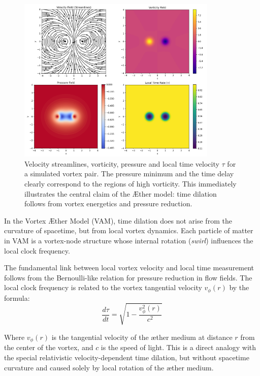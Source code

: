 \begin{figure}[htbp]
    \centering
    \includegraphics[width=0.85\textwidth]{images/01-streamlinesDiPole}
    \caption{Velocity streamlines, vorticity, pressure and local time velocity $\tau$ for a simulated vortex pair. The pressure minimum and the time delay clearly correspond to the regions of high vorticity. This immediately illustrates the central claim of the Æther model: time dilation follows from vortex energetics and pressure reduction.}
    \label{fig:vortexfields}
\end{figure}

In the Vortex Æther Model (VAM), time dilation does not arise from the curvature of spacetime, but from local vortex dynamics. Each particle of matter in VAM is a vortex-node structure whose internal rotation (\textit{swirl}) influences the local clock frequency.

The fundamental link between local vortex velocity and local time measurement follows from the Bernoulli-like relation for pressure reduction in flow fields. The local clock frequency is related to the vortex tangential velocity $v_{\phi}(r)$ by the formula:
\begin{equation}\label{eq:vortex_time_dilation}
\frac{d\tau}{dt} = \sqrt{1 - \frac{v_{\phi}^2(r)}{c^2}}
\end{equation}

Where $v_{\phi}(r)$ is the tangential velocity of the æther medium at distance $r$ from the center of the vortex, and $c$ is the speed of light. This is a direct analogy with the special relativistic velocity-dependent time dilation, but without spacetime curvature and caused solely by local rotation of the æther medium.


